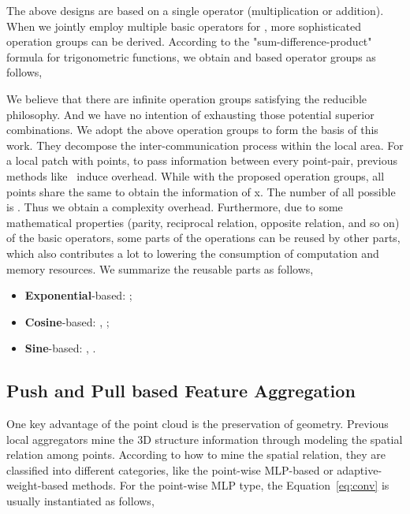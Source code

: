 \documentclass[journal]{IEEEtran}
\begin{document}
The above designs are based on a single operator (multiplication or addition). When we jointly employ multiple basic operators for , more sophisticated operation groups can be derived. According to the "sum-difference-product" formula for trigonometric functions, we obtain  and  based operator groups as follows,


\begin{small}

\end{small}

\begin{small}

\end{small}

We believe that there are infinite operation groups satisfying the reducible philosophy. And we have no intention of exhausting those potential superior combinations. We adopt the above operation groups to form the basis of this work. They decompose the inter-communication process within the local area. For a local patch with  points, to pass information between every point-pair, previous methods like~\cite{zhao2019pointweb} induce  overhead. While with the proposed operation groups, all points share the same  to obtain the information of x. The number of all possible  is . Thus we obtain a  complexity overhead. Furthermore, due to some mathematical properties (parity, reciprocal relation, opposite relation, and so on) of the basic operators, some parts of the operations can be reused by other parts, which also contributes a lot to lowering the consumption of computation and memory resources. We summarize the reusable parts as follows,

\begin{itemize}
\item {\bf Exponential}-based: ;
    \item {\bf Cosine}-based: , ;
    \item {\bf Sine}-based: , .
\end{itemize}



\subsection{Push and Pull based Feature Aggregation}

One key advantage of the point cloud is the preservation of geometry. Previous local aggregators mine the 3D structure information through modeling the spatial relation among points. According to how to mine the spatial relation, they are classified into different categories, like the point-wise MLP-based or adaptive-weight-based methods. For the point-wise MLP type, the Equation~\ref{eq:conv} is usually instantiated as follows,
\end{document}
